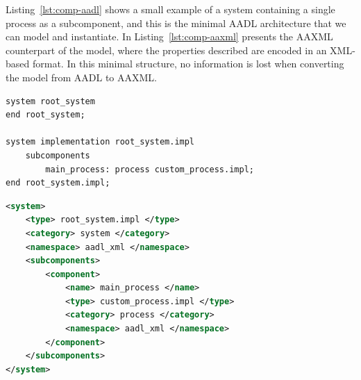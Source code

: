Listing~\ref{lst:comp-aadl} shows a small example of a system containing a single process as a subcomponent, and this is the minimal AADL architecture that we can model and instantiate. In Listing~\ref{lst:comp-aaxml} presents the AAXML counterpart of the model, where the properties described are encoded in an XML-based format. In this minimal structure, no information is lost when converting the model from AADL to AAXML.

\bigskip

\begin{lstlisting}[language=AADL,caption={Minimal AADL model},label=lst:comp-aadl]
system root_system
end root_system;

system implementation root_system.impl
	subcomponents
		main_process: process custom_process.impl;
end root_system.impl;
\end{lstlisting}

\begin{lstlisting}[language=XML,caption={AAXML representation of the minimal AADL model},label=lst:comp-aaxml]
<system>
	<type> root_system.impl </type>
	<category> system </category>
	<namespace> aadl_xml </namespace>
	<subcomponents>
		<component>
			<name> main_process </name>
			<type> custom_process.impl </type>
			<category> process </category>
			<namespace> aadl_xml </namespace>
		</component>
	</subcomponents>
</system>
\end{lstlisting}

